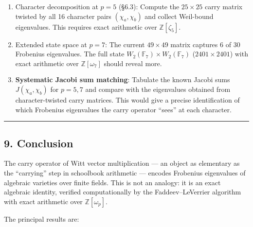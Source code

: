 \documentclass[
  11pt,
]{article}
\begin{document}
\begin{enumerate}
\def\labelenumi{\arabic{enumi}.}
\item
  Character decomposition at \(p = 5\) (§6.3): Compute the \(25 \times 25\)
  carry matrix twisted by all 16 character pairs \((\chi_a, \chi_b)\) and
  collect Weil-bound eigenvalues. This requires exact arithmetic over
  \(\mathbb{Z}[\zeta_5]\).
\item
  Extended state space at \(p = 7\): The current \(49 \times 49\) matrix
  captures 6 of 30 Frobenius eigenvalues. The full state
  \(W_2(\mathbb{F}_7) \times W_2(\mathbb{F}_7)\) (\(2401 \times 2401\)) with
  exact arithmetic over \(\mathbb{Z}[\omega_7]\) should reveal more.
\item
  \textbf{Systematic Jacobi sum matching}: Tabulate the known Jacobi sums
  \(J(\chi_a, \chi_b)\) for \(p = 5, 7\) and compare with the eigenvalues
  obtained from character-twisted carry matrices. This would give a precise
  identification of which Frobenius eigenvalues the carry operator ``sees'' at
  each character.
\end{enumerate}

\begin{center}\rule{0.5\linewidth}{0.5pt}\end{center}

\newpage

\subsection{9. Conclusion}\label{conclusion}

The carry operator of Witt vector multiplication --- an object as elementary as
the ``carrying'' step in schoolbook arithmetic --- encodes Frobenius eigenvalues
of algebraic varieties over finite fields. This is not an analogy: it is an
exact algebraic identity, verified computationally by the Faddeev--LeVerrier
algorithm with exact arithmetic over \(\mathbb{Z}[\omega_p]\).

The principal results are:
\end{document}
